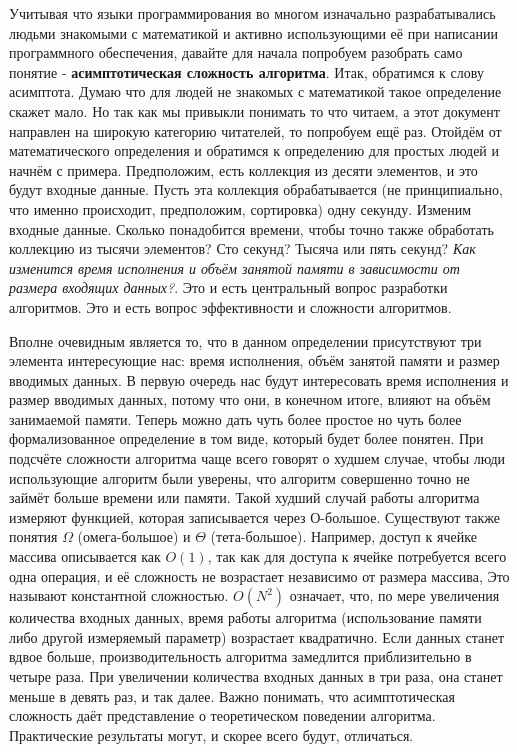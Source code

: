 \documentclass[fontsize=14bp]{report}
\begin{document}
Учитывая что языки программирования во многом изначально разрабатывались людьми знакомыми с математикой и активно использующими её при написании программного обеспечения, давайте для начала попробуем разобрать само понятие - \textbf{асимптотическая сложность алгоритма}. Итак, обратимся к слову асимптота.
Думаю что для людей не знакомых с математикой такое определение скажет мало. Но так как мы привыкли понимать то что читаем, а этот документ направлен на широкую категорию читателей, то попробуем ещё раз. Отойдём от математического определения и обратимся к определению для простых людей и начнём с примера. Предположим, есть коллекция из десяти элементов, и это будут входные данные. Пусть эта коллекция обрабатывается (не принципиально, что именно происходит, предположим, сортировка) одну секунду. Изменим входные данные. Сколько понадобится времени, чтобы точно также обработать коллекцию из тысячи элементов? Сто секунд? Тысяча или пять секунд? \textit{Как изменится время исполнения и объём занятой памяти в зависимости от размера входящих данных?}. Это и есть центральный вопрос разработки алгоритмов. Это и есть вопрос эффективности и сложности алгоритмов.

Вполне очевидным является то, что в данном определении присутствуют три элемента интересующие нас: время исполнения, объём занятой памяти и размер вводимых данных. В первую очередь нас будут интересовать время исполнения и размер вводимых данных, потому что они, в конечном итоге, влияют на объём занимаемой памяти. Теперь можно дать чуть более простое но чуть более формализованное определение в том виде, который будет более понятен. 
При подсчёте сложности алгоритма чаще всего говорят о худшем случае, чтобы люди использующие алгоритм были уверены, что алгоритм совершенно точно не займёт больше времени или памяти. Такой худший случай работы алгоритма измеряют функцией, которая записывается через О-большое. Существуют также понятия $\Omega$ (омега-большое) и $\Theta$ (тета-большое). Например, доступ к ячейке массива описывается как $O(1)$, так как для доступа к ячейке потребуется всего одна операция, и её сложность не возрастает независимо от размера массива, Это называют константной сложностью. $O(N^2)$ означает, что, по мере увеличения количества входных данных, время работы алгоритма (использование памяти либо другой измеряемый параметр) возрастает квадратично. Если данных станет вдвое больше, производительность алгоритма замедлится приблизительно в четыре раза. При увеличении количества входных данных в три раза, она станет меньше в девять раз, и так далее. Важно понимать, что асимптотическая сложность даёт представление о теоретическом поведении алгоритма. Практические результаты могут, и скорее всего будут, отличаться.
\end{document}
